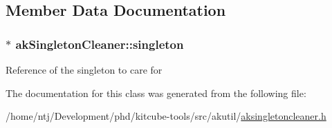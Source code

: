 \subsection{Member Data Documentation}
\hypertarget{classakSingletonCleaner_aae2ff315a00eb9214a6212e50feaab97}{
\subsubsection[{singleton}]{$\ast$ ak\-Singleton\-Cleaner\-::singleton\hspace{0.3cm}{\ttfamily [private]}}}\label{classakSingletonCleaner_aae2ff315a00eb9214a6212e50feaab97}
Reference of the singleton to care for 

The documentation for this class was generated from the following file\-:\begin{DoxyCompactItemize}
\item 
/home/ntj/\-Development/phd/kitcube-\/tools/src/akutil/\hyperlink{aksingletoncleaner_8h}{aksingletoncleaner.\-h}\end{DoxyCompactItemize}
